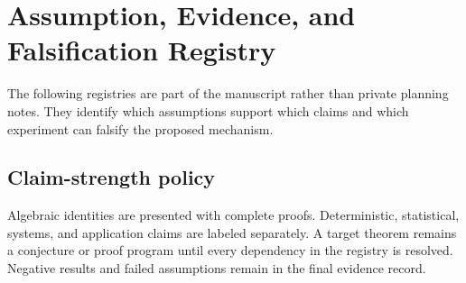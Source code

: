 \section{Assumption, Evidence, and Falsification Registry}
\label{sec:a-registry}
The following registries are part of the manuscript rather than private planning notes. They identify which assumptions support which claims and which experiment can falsify the proposed mechanism.




\subsection{Claim-strength policy}
Algebraic identities are presented with complete proofs. Deterministic, statistical, systems, and application claims are labeled separately. A target theorem remains a conjecture or proof program until every dependency in the registry is resolved. Negative results and failed assumptions remain in the final evidence record.
